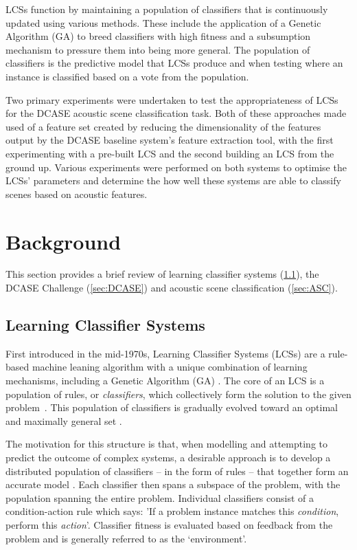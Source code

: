 \documentclass[11pt]{article}
\begin{document}
LCSs function by maintaining a population of classifiers that is continuously updated using various methods. These include the application of a Genetic Algorithm (GA) to breed classifiers with high fitness and a subsumption mechanism to pressure them into being more general. The population of classifiers is the predictive model that LCSs produce and when testing where an instance is classified based on a vote from the population.

Two primary experiments were undertaken to test the appropriateness of LCSs for the DCASE acoustic scene classification task. Both of these approaches made used of a feature set created by reducing the dimensionality of the features output by the DCASE baseline system's feature extraction tool, with the first experimenting with a pre-built LCS and the second building an LCS from the ground up. Various experiments were performed on both systems to optimise the LCSs' parameters and determine the how well these systems are able to classify scenes based on acoustic features.

\section{Background}

This section provides a brief review of learning classifier systems (\ref{sec:LCS}), the DCASE Challenge (\ref{sec:DCASE}) and acoustic scene classification (\ref{sec:ASC}).

\subsection{Learning Classifier Systems}
\label{sec:LCS}

First introduced in the mid-1970s, Learning Classifier Systems (LCSs) are a rule-based machine leaning algorithm with a unique combination of learning mechanisms, including a Genetic Algorithm (GA) \cite{Butz2015}. The core of an LCS is a population of rules, or \textit{classifiers}, which collectively form the solution to the given problem~\cite{Urbanowicz2009}. This population of classifiers is gradually evolved toward an optimal and maximally general set \cite{Urbanowicz2009}.

The motivation for this structure is that, when modelling and attempting to predict the outcome of complex systems, a desirable approach is to develop a distributed population of classifiers -- in the form of rules -- that together form an accurate model \cite[p.~2]{Urbanowicz2009}. Each classifier then spans a subspace of the problem, with the population spanning the entire problem. Individual classifiers consist of a condition-action rule which says: 'If a problem instance matches this \textit{condition}, perform this \textit{action}'. Classifier fitness is evaluated based on feedback from the problem and is generally referred to as the `environment'.
\end{document}
